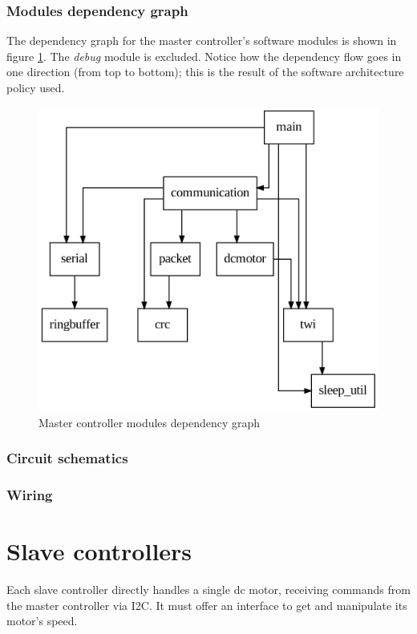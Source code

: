 \documentclass[binding=0.6cm,Lau]{sapthesis}
\makeatletter
\def\maxwidth#1{\ifdim\Gin@nat@width>#1 #1\else\Gin@nat@width\fi}
\makeatother
\begin{document}
\subsection{Modules dependency graph}
The dependency graph for the master controller's software modules is shown in
figure \ref{img:master-deps-graph}. The \emph{debug} module is excluded. Notice
how the dependency flow goes in one direction (from top to bottom); this is the
result of the software architecture policy used.
\begin{figure}[hbp]
\begin{centering}
  \includegraphics[width=\maxwidth{\textwidth}]{img/master}
  \caption{Master controller modules dependency graph}
  \label{img:master-deps-graph}
\end{centering}
\end{figure}

\subsection{Circuit schematics}

\subsection{Wiring}


\chapter{Slave controllers}
\label{ch:slave}
Each slave controller directly handles a single dc motor, receiving commands
from the master controller via I2C. It must offer an interface to get and
manipulate its motor's speed.
\end{document}
